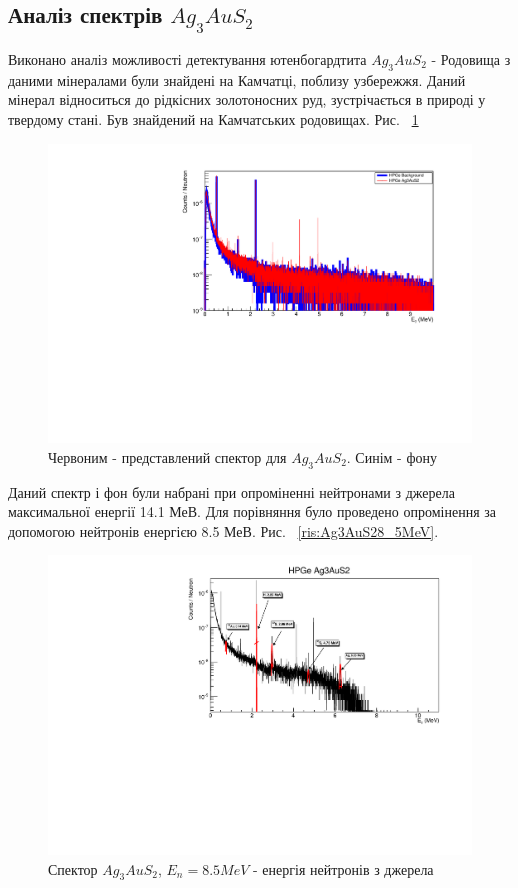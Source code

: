 \documentclass[a4paper, 14pt]{article}
\numberwithin{equation}{section}
\numberwithin{table}{section}
\begin{document}
\subsection{Аналіз спектрів $Ag_3AuS_2$}
Виконано аналіз можливості детектування ютенбогардтита $Ag_3AuS_2$ - Родовища з даними мінералами були знайдені на Камчатці, поблизу узбережжя. Даний мінерал відноситься до рідкісних золотоносних руд, зустрічається в природі у твердому стані. Був знайдений на Камчатських родовищах. Рис. ~\ref{ris:Ag3AuS2Fon}		
\begin{figure}[hbt!]
	\centering \includegraphics[width=1\textwidth]{res/auFonAllLog.pdf}
	\caption{Червоним - представлений спектор для $Ag_3AuS_2$. Синім - фону} 
	\label{ris:Ag3AuS2Fon}	
\end{figure} 	
Даний спектр і фон були набрані при опроміненні нейтронами з джерела максимальної енергії 14.1 МеВ.
Для порівняння було проведено опромінення за допомогою нейтронів енергією 8.5 МеВ. Рис. ~\ref{ris:Ag3AuS28_5MeV}.
\begin{figure}[hbt!]
	\centering \includegraphics[width=1\textwidth]{res/AgAuSsenst.pdf}
	\caption{Спектор $Ag_3AuS_2$, $E_{n} = 8.5 MeV$ - енергія нейтронів з джерела}
	\label{ris:Ag3AuS28_5MeVPick}	
\end{figure} 
\end{document}
